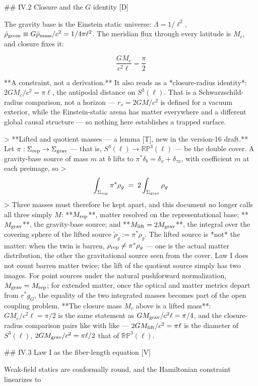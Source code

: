 ## IV.2 Closure and the $G$ identity [D]

The gravity base is the Einstein static universe: $\Lambda = 1/\ell^2$, $\bar\rho_{\rm geom}\equiv G\bar\rho_{\rm mass}/c^2 = 1/4\pi\ell^2$. The meridian flux through every latitude is $M_c$, and closure fixes it:

$$\frac{GM_c}{c^2\ell} = \frac{\pi}{2}$$

**A constraint, not a derivation.** It also reads as a *closure-radius identity*: $2GM_c/c^2 = \pi\ell$, the antipodal distance on $S^3(\ell)$. That is a Schwarzschild-radius comparison, not a horizon — $r_s = 2GM/c^2$ is defined for a vacuum exterior, while the Einstein-static arena has matter everywhere and a different global causal structure — so nothing here establishes a trapped surface.

> **Lifted and quotient masses — a lemma [T], new in the version-16 draft.** Let $\pi:\Sigma_{\rm rep}\to\Sigma_{\rm grav}$ — that is, $S^3(\ell)\to\mathbb{RP}^3(\ell)$ — be the double cover. A gravity-base source of mass $m$ at $b$ lifts to $\pi^*\delta_b = \delta_x+\delta_{\tau x}$, with coefficient $m$ at each preimage, so
> $$\int_{\Sigma_{\rm rep} }\pi^*\rho_g\;=\;2\int_{\Sigma_{\rm grav} }\rho_g$$
> Three masses must therefore be kept apart, and this document no longer calls all three simply $M$: **$M_{\rm rep}$**, matter resolved on the representational base; **$M_{\rm grav}$**, the gravity-base source; and **$M_{\rm lift} = 2M_{\rm grav}$**, the integral over the covering sphere of the lifted source $\tilde\rho_g := \pi^*\rho_g$. The lifted source is *not* the matter: when the twin is barren, $\rho_{\rm rep}\neq\pi^*\rho_g$ — one is the actual matter distribution, the other the gravitational source seen from the cover. Law I does not count barren matter twice; the lift of the quotient source simply has two images. For point sources under the natural pushforward normalization, $M_{\rm grav} = M_{\rm rep}$; for extended matter, once the optical and matter metrics depart from $r^*g_G$, the equality of the two integrated masses becomes part of the open coupling problem. **The closure mass $M_c$ above is a lifted mass**: $GM_c/c^2\ell = \pi/2$ is the same statement as $GM_{\rm grav}/c^2\ell = \pi/4$, and the closure-radius comparison pairs like with like — $2GM_{\rm lift}/c^2 = \pi\ell$ is the diameter of $S^3(\ell)$, $2GM_{\rm grav}/c^2 = \pi\ell/2$ that of $\mathbb{RP}^3(\ell)$.

## IV.3 Law I as the fiber-length equation [V]

Weak-field statics are conformally round, and the Hamiltonian constraint linearizes to

